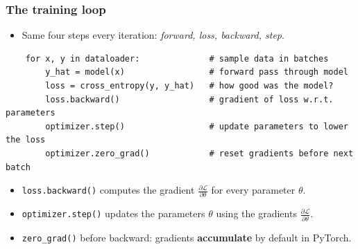 
\begin{frame}[fragile]
\frametitle{The training loop}
\begin{itemize}
    \item Same four steps every iteration: \textit{forward, loss, backward, step}.
\end{itemize}
\begin{block}{}
\begin{lstlisting}
    for x, y in dataloader:              # sample data in batches
        y_hat = model(x)                 # forward pass through model
        loss = cross_entropy(y, y_hat)   # how good was the model?
        loss.backward()                  # gradient of loss w.r.t. parameters
        optimizer.step()                 # update parameters to lower the loss
        optimizer.zero_grad()            # reset gradients before next batch
\end{lstlisting}
\end{block}
\pause
\begin{itemize}
    \item \texttt{loss.backward()} computes the gradient $\frac{\partial \mathcal{L}}{\partial \theta}$ for every parameter $\theta$.
    \pause
    \item \texttt{optimizer.step()} updates the parameters $\theta$ using the gradients $\frac{\partial \mathcal{L}}{\partial \theta}$.
    \pause
    \item \texttt{zero\_grad()} before backward: gradients \textbf{accumulate}
    by default in PyTorch.
\end{itemize}
\end{frame}

